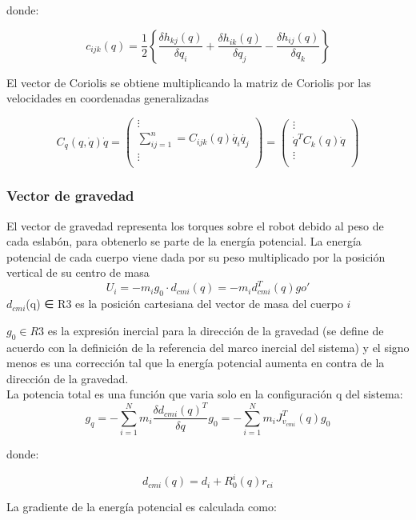 \documentclass[journal]{IEEEtran}
\begin{document}
    donde: 

    $$c_{ijk}(q)=\frac{1}{2}\left \{ \frac{\delta h_{kj}(q)}{\delta q_{i}}+\frac{\delta h_{ik}(q)}{\delta q_{j}}
                 -\frac{\delta h_{ij}(q)}{\delta q_{k}} \right \}$$

    El vector de Coriolis se obtiene multiplicando la matriz de Coriolis por las velocidades en coordenadas generalizadas

    $$C_{q}(q,\dot{q})\dot{q}=\begin{pmatrix}
    \vdots\\
    \sum_{ij=1}^{n}=C_{ijk}(q)\dot{q_{i}}\dot{q_{j}}\\ 
    \vdots\\
    \end{pmatrix}
    =\begin{pmatrix}
    \vdots\\
    \dot{q}^{T}C_{k}(q)\dot{q}\\ 
    \vdots\\
    \end{pmatrix}$$

    \subsubsection{Vector de gravedad}
    El vector de gravedad representa los torques sobre el robot debido al peso de cada eslabón, para obtenerlo se parte
    de la energía potencial. La energía potencial de cada cuerpo viene dada por su peso multiplicado por la posición
    vertical de su centro de masa
    $$U_{i}=-m_{i}g_{0}\cdot d_{cmi}(q)=-m_{i}d^{T}_{cmi}(q)g{o'}$$
    $d_{cmi}$(q) ∈ R3 es la posición cartesiana del vector de masa del cuerpo $i$

    $g_0 ∈ R3$ es la expresión inercial para la dirección de la gravedad (se define de acuerdo con la definición de la
    referencia del marco inercial del sistema) y el signo menos es una corrección tal que la energía potencial aumenta
    en contra de la dirección de la gravedad.\\
    La potencia total es una función que varia solo en la configuración q del sistema: 
    $$g_{q}=-\sum_{i=1}^{N}m_{i}\frac{\delta d_{cmi}(q)^{T}}{\delta q}g_{0}=-\sum_{i=1}^{N}m_{i}J_{v_{cmi}}^{T}(q)g_{0}$$

    donde:

    $$d_{cmi}(q)=d_{i}+R^{i}_{0}(q)r_{ci}$$

    La gradiente de la energía potencial es calculada como:
\end{document}
